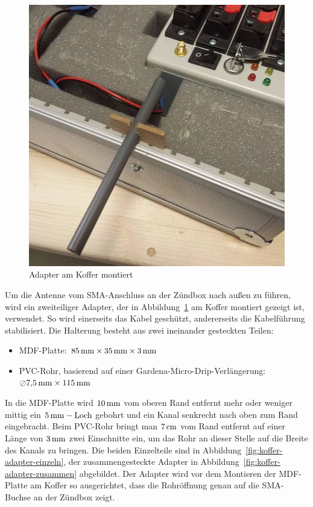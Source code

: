 \documentclass[pdftex, parskip, numbers=noenddot, toc=listof]{scrbook}
\begin{document}
					\begin{figure}
						\centering
						\includegraphics[width=.75\textwidth]{Bilder/koffer-adapter-montiert}
						\caption{Adapter am Koffer montiert}
						\label{fig:koffer-adapter-montiert}
					\end{figure}

					Um die Antenne vom SMA-Anschluss an der Zündbox nach außen zu führen, wird ein zweiteiliger Adapter, der in Abbildung~\ref{fig:koffer-adapter-montiert} am Koffer montiert gezeigt ist, verwendet. So wird einerseits das Kabel geschützt, andererseits die Kabelführung stabilisiert. Die Halterung besteht aus zwei ineinander gesteckten Teilen:
					\begin{itemize}
						\item MDF-Platte: $\unit[85]{mm} \times \unit[35]{mm} \times \unit[3]{mm}$
						\item PVC-Rohr, basierend auf einer Gardena-Micro-Drip-Verlängerung: $\oslash\unit[7{,}5]{mm} \times \unit[115]{mm}$
					\end{itemize}

					In die MDF-Platte wird $\unit[10]{mm}$ vom oberen Rand entfernt mehr oder weniger mittig ein $\unit[5]{mm}-\text{Loch}$ gebohrt und ein Kanal senkrecht nach oben zum Rand eingebracht. Beim PVC-Rohr bringt man $\unit[7]{cm}$ vom Rand entfernt auf einer Länge von $\unit[3]{mm}$ zwei Einschnitte ein, um das Rohr an dieser Stelle auf die Breite des Kanals zu bringen. Die beiden Einzelteile sind in Abbildung~\ref{fig:koffer-adapter-einzeln}, der zusammengesteckte Adapter in Abbildung~\ref{fig:koffer-adapter-zusammen} abgebildet. Der Adapter wird vor dem Montieren der MDF-Platte am Koffer so ausgerichtet, dass die Rohröffnung genau auf die SMA-Buchse an der Zündbox zeigt.
\end{document}
